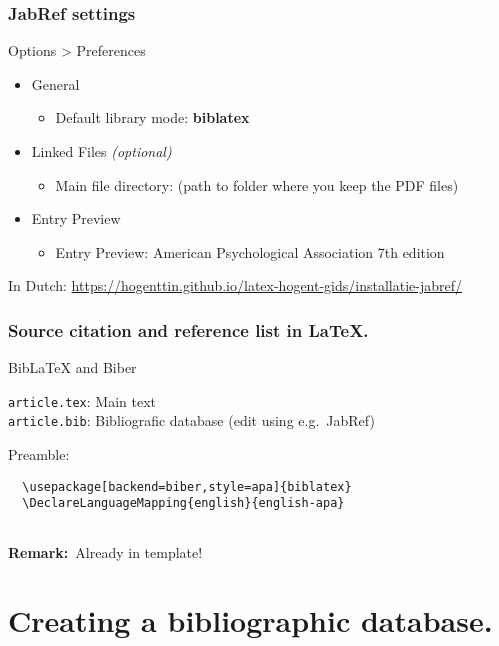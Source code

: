 \documentclass[aspectratio=169]{beamer}
\begin{document}
\begin{frame}
    \frametitle{JabRef settings}
    
   Options > Preferences

   \begin{itemize}
        \item General
        \begin{itemize}
            \item Default library mode: \textbf{biblatex}
        \end{itemize}
        \item Linked Files \textit{(optional)}
        \begin{itemize}
            \item Main file directory: (path to folder where you keep the PDF files)
        \end{itemize}
        \item{Entry Preview}
        \begin{itemize}
            \item Entry Preview: American Psychological Association 7th edition
        \end{itemize}
    \end{itemize}
    \bigskip
    In Dutch: \url{https://hogenttin.github.io/latex-hogent-gids/installatie-jabref/}
    
\end{frame}
\begin{frame}[fragile]
  \frametitle{Source citation and reference list in {\LaTeX}.}

  Bib{\LaTeX} and Biber

  \vspace{18pt}

  \verb|article.tex|: Main text\\
  \verb|article.bib|: Bibliografic database (edit using e.g.~JabRef)

  \bigskip

  Preamble:

  \begin{verbatim}
  \usepackage[backend=biber,style=apa]{biblatex}
  \DeclareLanguageMapping{english}{english-apa}
  
  \end{verbatim}

    \textbf{Remark:}\ Already in template!   

\end{frame}

\section{Creating a bibliographic database.}
\end{document}
